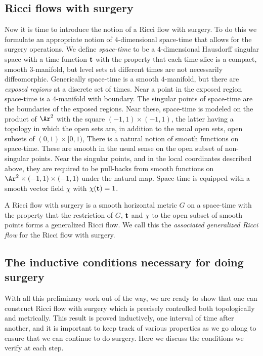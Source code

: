 \subsection{Ricci flows with surgery}

Now it is time to introduce the notion of a Ricci flow with
surgery. To do this we formulate an
appropriate notion of $4$-dimensional space-time that allows for the
surgery operations. We define {\em space-time} to be a
$4$-dimensional Hausdorff singular space with a time function ${\bf
t}$ with the property that each time-slice is a compact, smooth
$3$-manifold, but level sets at different times are not necessarily
diffeomorphic. Generically space-time is a smooth $4$-manifold, but
there are {\em exposed regions} at a discrete
set of times. Near a point in the exposed region  space-time is a
$4$-manifold with boundary. The singular points of space-time are
the boundaries of the exposed regions. Near these, space-time is
modeled on the product of $\Ar^2$ with the square $(-1,1)\times
(-1,1)$, the latter having a topology in which the open sets are, in
addition to the usual open sets, open subsets of $(0,1)\times
[0,1)$,  There is a natural
notion of smooth functions on space-time. These are smooth in the
usual sense on the open subset of non-singular points. Near the
singular points, and in the local coordinates described above, they
are required to be pull-backs from smooth functions on $\Ar^2\times
(-1,1)\times (-1,1)$ under the natural map. Space-time is equipped with a smooth vector field $\chi$
with $\chi({\bf t})=1$.




A Ricci flow with surgery is a smooth horizontal metric $G$ on a
space-time  with the property that the restriction of $G$, ${\bf t}$
and $\chi$ to the open subset of smooth points forms a generalized
Ricci flow.  We call this the {\em associated generalized Ricci
flow} for the Ricci flow with surgery.


\subsection{The inductive conditions necessary for doing surgery}

With all this preliminary work out of the way, we are ready to show
that one can construct Ricci flow with surgery which is precisely
controlled both topologically and metrically. This result is proved
inductively, one interval of time after another, and it is important
to keep track of various properties as we go along to ensure that we
can continue to do surgery. Here we discuss the conditions we verify
at each step.

